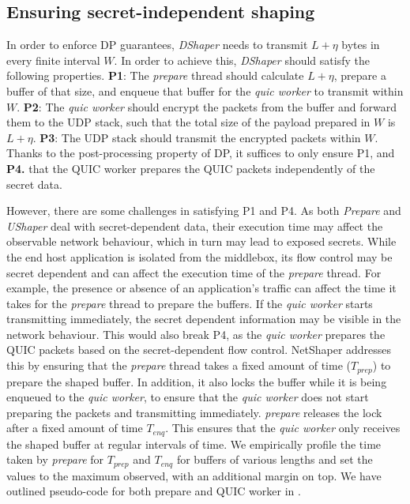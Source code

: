 \subsection{Ensuring secret-independent shaping}
\label{subsed:netshaper-secret-independent-shaping-implementation}

In order to enforce DP guarantees, \textit{DShaper} needs to transmit $L + \eta$ bytes in every finite interval $W$.
In order to achieve this, \textit{DShaper} should satisfy the following properties.
\textbf{P1}: The \textit{prepare} thread should calculate $L + \eta$, prepare a buffer of that size, and enqueue that buffer for the \textit{quic worker} to transmit within $W$.
\textbf{P2}: The \textit{quic worker} should encrypt the packets from the buffer and forward them to the UDP stack, such that the total size of the payload prepared in $W$ is $L + \eta$.
\textbf{P3}: The UDP stack should transmit the encrypted packets within $W$.
Thanks to the post-processing property of DP, it suffices to only ensure P1, and \textbf{P4.} that the QUIC worker prepares the QUIC packets independently of the secret data.

However, there are some challenges in satisfying P1 and P4.
As both \textit{Prepare} and \textit{UShaper} deal with secret-dependent data, their execution time may affect the observable network behaviour, which in turn may lead to exposed secrets.
While the end host application is isolated from the middlebox, its flow control may be secret dependent and can affect the execution time of the \textit{prepare} thread.
For example, the presence or absence of an application's traffic can affect the time it takes for the \textit{prepare} thread to prepare the buffers.
If the \textit{quic worker} starts transmitting immediately, the secret dependent information may be visible in the network behaviour. 
This would also break P4, as the \textit{quic worker} prepares the QUIC packets based on the secret-dependent flow control.
NetShaper addresses this by ensuring that the \textit{prepare} thread takes a fixed amount of time ($T_{prep}$) to prepare the shaped buffer.
In addition, it also locks the buffer while it is being enqueued to the \textit{quic worker}, to ensure that the \textit{quic worker} does not start preparing the packets and transmitting immediately.
\textit{prepare} releases the lock after a fixed amount of time $T_{enq}$.
This ensures that the \textit{quic worker} only receives the shaped buffer at regular intervals of time.
We empirically profile the time taken by \textit{prepare} for $T_{prep}$ and $T_{enq}$ for buffers of various lengths and set the values to the maximum observed, with an additional margin on top.
We have outlined pseudo-code for both prepare and QUIC worker in .


